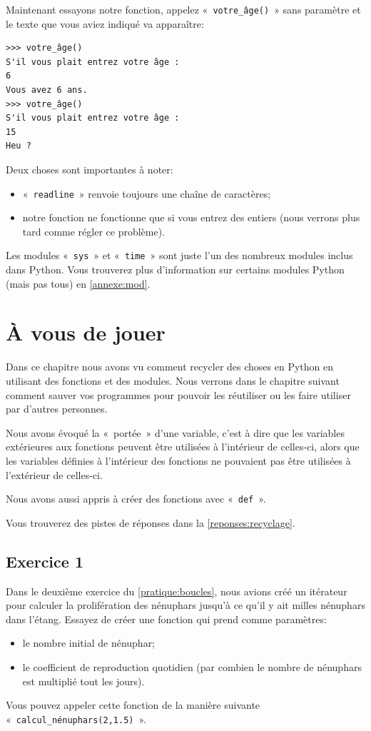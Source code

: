 Maintenant essayons notre fonction, appelez  «~\texttt{votre\_âge()}~» sans paramètre et le texte que vous aviez indiqué va apparaître:

\begin{Verbatim}[frame=single,rulecolor=\color{mbleu}, label=à taper]
>>> votre_âge()
S'il vous plait entrez votre âge :
6
Vous avez 6 ans.
>>> votre_âge()
S'il vous plait entrez votre âge :
15
Heu ?
\end{Verbatim}

Deux choses sont importantes à noter:
\begin{itemize}
\item «~\texttt{readline}~» renvoie toujours une chaîne de caractères;
\item notre fonction ne fonctionne que si vous entrez des entiers (nous verrons plus tard comme régler ce problème).
\end{itemize}

Les modules «~\texttt{sys}~»  et «~\texttt{time}~»  sont juste l'un des nombreux modules inclus dans Python. Vous trouverez plus d'information sur certains modules Python (mais pas tous) en \autoref{annexe:mod}.

\section{À vous de jouer\label{pratique:recyclage}}
Dans ce chapitre nous avons vu comment recycler des choses en Python en utilisant des fonctions et des modules.
Nous verrons dans le chapitre suivant comment sauver vos programmes pour pouvoir les réutiliser ou les faire utiliser par d'autres personnes.

Nous avons évoqué la «~portée~» d'une variable, c'est à dire que les variables extérieures aux fonctions peuvent être utilisées à l'intérieur de celles-ci, alors que les variables définies à l'intérieur des fonctions ne pouvaient pas être utilisées à l'extérieur de celles-ci.

Nous avons aussi appris à créer des fonctions avec «~\texttt{def}~».

Vous trouverez des pistes de réponses dans la \autoref{reponses:recyclage}.


\subsection{Exercice 1}
Dans le deuxième exercice du \autoref{pratique:boucles}, nous avions créé un itérateur pour calculer la prolifération des nénuphars jusqu'à ce qu'il y ait milles nénuphars dans l'étang.
Essayez de créer une fonction qui prend comme paramètres:
\begin{itemize}
\item le nombre initial de nénuphar;
\item le coefficient de reproduction quotidien (par combien le nombre de nénuphars est multiplié tout les jours).
\end{itemize}
Vous pouvez appeler cette fonction de la manière suivante «~\texttt{calcul\_nénuphars(2,1.5)}~».

